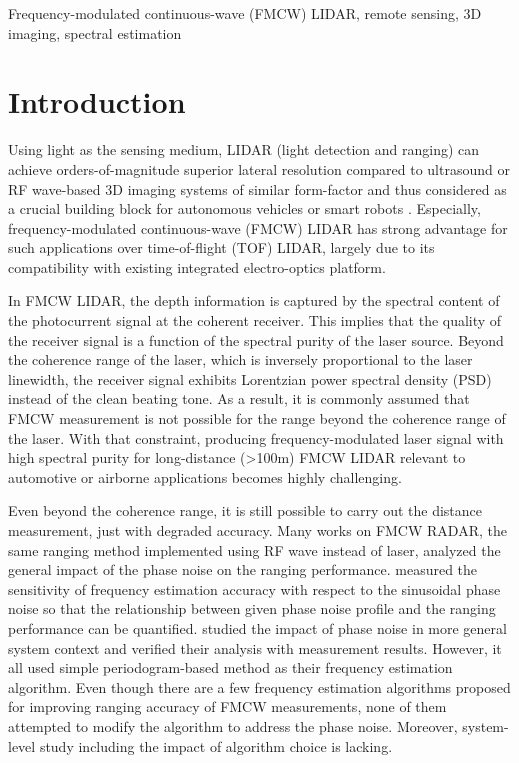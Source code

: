 \documentclass{article}
\begin{document}
\begin{keywords}Frequency-modulated continuous-wave (FMCW) LIDAR, remote sensing, 3D imaging, spectral estimation
\end{keywords}

\section{Introduction}
\label{sec:intro}

Using light as the sensing medium, LIDAR (light detection and ranging) can achieve orders-of-magnitude superior lateral resolution compared to ultrasound or RF wave-based 3D imaging systems of similar form-factor and thus considered as a crucial building block for autonomous vehicles or smart robots \cite{autonomouscar}\cite{smartrobot}. Especially, frequency-modulated continuous-wave (FMCW) LIDAR has strong advantage for such applications over time-of-flight (TOF) LIDAR, largely due to its compatibility with existing integrated electro-optics platform.


In FMCW LIDAR, the depth information is captured by the spectral content of the photocurrent signal at the coherent receiver. This implies that the quality of the receiver signal is a function of the spectral purity of the laser source. Beyond the coherence range of the laser, which is inversely proportional to the laser linewidth, the receiver signal exhibits Lorentzian power spectral density (PSD) instead of the clean beating tone. As a result, it is commonly assumed that FMCW measurement is not possible for the range beyond the coherence range of the laser. With that constraint, producing frequency-modulated laser signal with high spectral purity for long-distance (\textgreater 100m) FMCW LIDAR relevant to automotive or airborne applications becomes highly challenging.


Even beyond the coherence range, it is still possible to carry out the distance measurement, just with degraded accuracy. Many works on FMCW RADAR, the same ranging method implemented using RF wave instead of laser, analyzed the general impact of the phase noise on the ranging performance. \cite{C2} measured the sensitivity of frequency estimation accuracy with respect to the sinusoidal phase noise so that the relationship between given phase noise profile and the ranging performance can be quantified. \cite{C2} studied the impact of phase noise in more general system context and verified their analysis with measurement results. However, it all used simple periodogram-based method as their frequency estimation algorithm. Even though there are a few frequency estimation algorithms proposed for improving ranging accuracy of FMCW measurements\cite{C2}\cite{C2}, none of them attempted to modify the algorithm to address the phase noise. Moreover, system-level study including the impact of algorithm choice is lacking.
\end{document}
